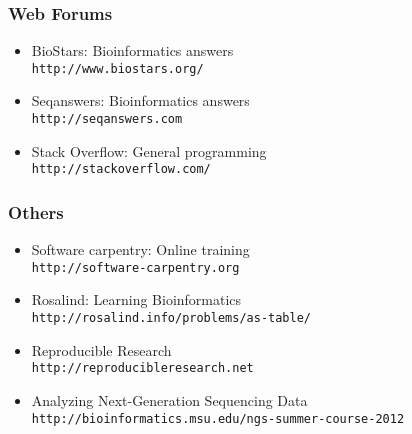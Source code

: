 \documentclass[ChapterTOCs,krantz2]{krantz} %
\begin{document}
\subsubsection{Web Forums}
\begin{itemize}
\item BioStars: Bioinformatics answers \\\texttt{http://www.biostars.org/}
\item Seqanswers: Bioinformatics answers \\\texttt{http://seqanswers.com}
\item Stack Overflow: General programming\\ \texttt{http://stackoverflow.com/}
\end{itemize}

\subsubsection{Others}
\begin{itemize}
\item Software carpentry: Online training
\\\texttt{http://software-carpentry.org}
\item Rosalind: Learning Bioinformatics \\\texttt{http://rosalind.info/problems/as-table/}
\item Reproducible Research \\\texttt{http://reproducibleresearch.net}
\item Analyzing Next-Generation Sequencing Data\\\texttt{http://bioinformatics.msu.edu/ngs-summer-course-2012}
\end{itemize}

 
\end{document}
